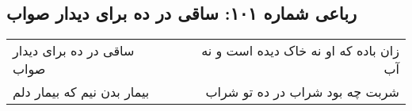 \begin{center}
\section*{رباعی شماره ۱۰۱: ساقی در ده برای دیدار صواب}
\label{sec:0101}
\begin{longtable}{l p{0.5cm} r}
ساقی در ده برای دیدار صواب
&&
زان باده که او نه خاک دیده است و نه آب
\\
بیمار بدن نیم که بیمار دلم
&&
شربت چه بود شراب در ده تو شراب
\\
\end{longtable}
\end{center}
